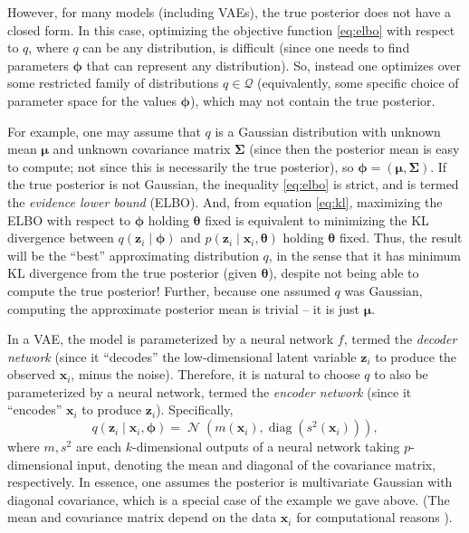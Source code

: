 \documentclass[reqno,11pt]{amsart}
\DeclareMathOperator\N{\mathcal{N}}
\newcommand\msigma{\boldsymbol{\Sigma}}
\newcommand\vmu{\boldsymbol{\mu}}
\newcommand\vphi{\boldsymbol{\phi}}
\newcommand\vtheta{\boldsymbol{\theta}}
\newcommand\vx{\mathbf{x}}
\newcommand\vz{\mathbf{z}}
\begin{document}

However, for many models (including VAEs), the true posterior does not have a
closed form. In this case, optimizing the objective function \eqref{eq:elbo}
with respect to $q$, where $q$ can be any distribution, is difficult (since one
needs to find parameters $\vphi$ that can represent any distribution). So,
instead one optimizes over some restricted family of distributions $q \in
\mathcal{Q}$ (equivalently, some specific choice of parameter space for the
values $\vphi$), which may not contain the true posterior.

For example, one may assume that $q$ is a Gaussian distribution with unknown
mean $\vmu$ and unknown covariance matrix $\msigma$ (since then the posterior
mean is easy to compute; not since this is necessarily the true posterior), so
$\vphi = (\vmu, \msigma)$. If the true posterior is not Gaussian, the
inequality \eqref{eq:elbo} is strict, and is termed the \emph{evidence lower
bound} (ELBO). And, from equation \eqref{eq:kl}, maximizing the ELBO with
respect to $\vphi$ holding $\vtheta$ fixed is equivalent to minimizing the KL
divergence between $q(\vz_i \mid \vphi)$ and $p(\vz_i \mid \vx_i, \vtheta)$
holding $\vtheta$ fixed. Thus, the result will be the ``best'' approximating
distribution $q$, in the sense that it has minimum KL divergence from the true
posterior (given $\vtheta$), despite not being able to compute the true
posterior! Further, because one assumed $q$ was Gaussian, computing the
approximate posterior mean is trivial -- it is just $\vmu$.

In a VAE, the model is parameterized by a neural network $f$, termed the
\emph{decoder network} (since it ``decodes'' the low-dimensional latent
variable $\vz_i$ to produce the observed $\vx_i$, minus the noise). Therefore,
it is natural to choose $q$ to also be parameterized by a neural network,
termed the \emph{encoder network} (since it ``encodes'' $\vx_i$ to produce
$\vz_i$). Specifically,
%
\begin{equation}
  q(\vz_i \mid \vx_i, \vphi) = \N(m(\vx_i), \operatorname{diag}(s^2(\vx_i))),
\end{equation}
%
where $m, s^2$ are each $k$-dimensional outputs of a neural network taking
$p$-dimensional input, denoting the mean and diagonal of the covariance matrix,
respectively. In essence, one assumes the posterior is multivariate Gaussian
with diagonal covariance, which is a special case of the example we gave above.
(The mean and covariance matrix depend on the data $\vx_i$ for computational
reasons \cite{Gershman2014}).
\end{document}
